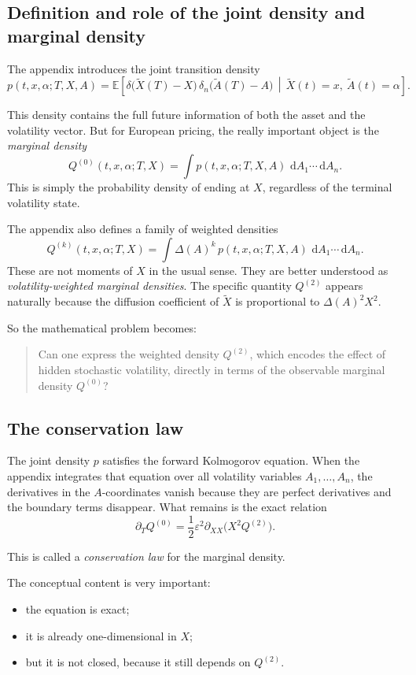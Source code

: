 \documentclass[11pt]{article}
\newcommand{\dd}{\,\mathrm{d}}
\newcommand{\EE}{\mathbb{E}}
\newcommand{\eps}{\varepsilon}
\newcommand{\X}{\widetilde{X}}
\newcommand{\Vol}{\widetilde{A}}
\begin{document}
\subsection{Definition and role of the joint density and marginal density}

The appendix introduces the joint transition density
\[
p(t,x,\alpha;T,X,A)
=
\EE\!\left[
\delta\!\bigl(\X(T)-X\bigr)\,
\delta_n\!\bigl(\Vol(T)-A\bigr)
\,\middle|\,
\X(t)=x,\ \Vol(t)=\alpha
\right].
\]

This density contains the full future information of both the asset and the volatility vector. But for European pricing, the really important object is the \emph{marginal density}
\[
Q^{(0)}(t,x,\alpha;T,X)=\int p(t,x,\alpha;T,X,A)\,\dd A_1\cdots \dd A_n.
\]
This is simply the probability density of ending at \(X\), regardless of the terminal volatility state.

The appendix also defines a family of weighted densities
\[
Q^{(k)}(t,x,\alpha;T,X)
=
\int \Delta(A)^k\, p(t,x,\alpha;T,X,A)\,\dd A_1\cdots \dd A_n.
\]
These are not moments of \(X\) in the usual sense. They are better understood as \emph{volatility-weighted marginal densities}. The specific quantity \(Q^{(2)}\) appears naturally because the diffusion coefficient of \(\X\) is proportional to \(\Delta(A)^2X^2\).

So the mathematical problem becomes:
\begin{quote}
Can one express the weighted density \(Q^{(2)}\), which encodes the effect of hidden stochastic volatility, directly in terms of the observable marginal density \(Q^{(0)}\)?
\end{quote}

\subsection{The conservation law}

The joint density \(p\) satisfies the forward Kolmogorov equation. When the appendix integrates that equation over all volatility variables \(A_1,\dots,A_n\), the derivatives in the \(A\)-coordinates vanish because they are perfect derivatives and the boundary terms disappear. What remains is the exact relation
\[
\partial_T Q^{(0)}
=
\frac12\eps^2 \partial_{XX}\!\bigl(X^2 Q^{(2)}\bigr).
\]

This is called a \emph{conservation law} for the marginal density.

The conceptual content is very important:
\begin{itemize}
    \item the equation is exact;
    \item it is already one-dimensional in \(X\);
    \item but it is not closed, because it still depends on \(Q^{(2)}\).
\end{itemize}
\end{document}
